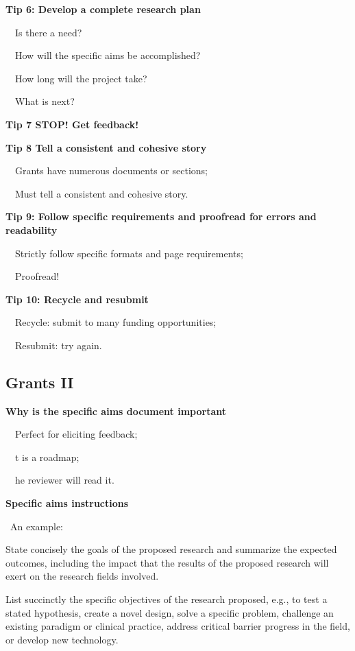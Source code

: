 \documentclass[a4paper, 12pt]{article}
\begin{document}
\newpage\textbf{Tip 6: Develop a complete research plan}
\par\ \textbullet\ Is there a need?
\par\ \textbullet\ How will the specific aims be accomplished?
\par\ \textbullet\ How long will the project take?
\par\ \textbullet\ What is next?

\textbf{Tip 7 STOP! Get feedback!}

\textbf{Tip 8 Tell a consistent and cohesive story}
\par\ \textbullet\ Grants have numerous documents or sections;
\par\ \textbullet\ Must tell a consistent and cohesive story.

\textbf{Tip 9: Follow specific requirements and proofread for errors and readability}
\par\ \textbullet\ Strictly follow specific formats and page requirements;
\par\ \textbullet\ Proofread!

\textbf{Tip 10: Recycle and resubmit}
\par\ \textbullet\ Recycle: submit to many funding opportunities;
\par\ \textbullet\ Resubmit: try again.

\subsection{Grants II}

\textbf{Why is the specific aims document important}
\par\ \textbullet\ Perfect for eliciting feedback;
\par\ \textbullet\ t is a roadmap;
\par\ \textbullet\ he reviewer will read it.

\textbf{Specific aims instructions}

\newpage\par\textbullet\ An example:
\par State concisely the goals of the proposed research and summarize the expected outcomes, including the impact that the results of the proposed research will exert on the research fields involved.
\par List succinctly the specific objectives of the research proposed, e.g., to test a stated hypothesis, create a novel design, solve a specific problem,
challenge an existing paradigm or clinical practice, address critical barrier progress in the field, or develop new technology.
\end{document}
